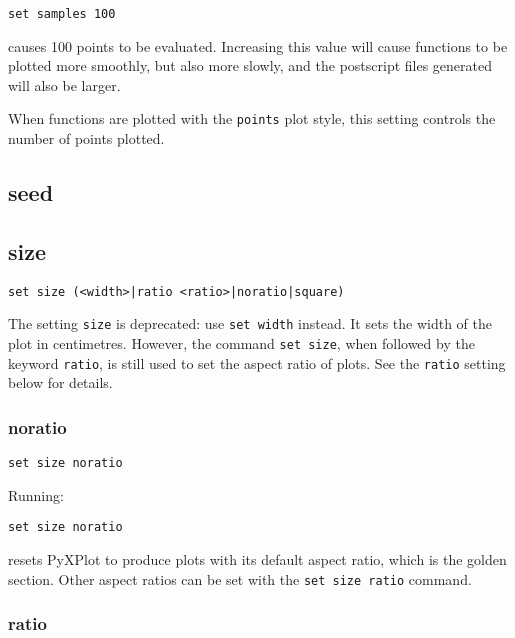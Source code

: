 \begin{verbatim}
set samples 100
\end{verbatim}

\noindent causes 100 points to be evaluated.  Increasing this value will cause
functions to be plotted more smoothly, but also more slowly, and the postscript
files generated will also be larger.

When functions are plotted with the {\tt points} plot style, this setting
controls the number of points plotted.


\subsection{seed}


\subsection{size}

\begin{verbatim}
set size (<width>|ratio <ratio>|noratio|square)
\end{verbatim}

The setting {\tt size} is deprecated: use {\tt set width} instead.  It sets the
width of the plot in centimetres. However, the command {\tt set size}, when
followed by the keyword {\tt ratio}, is still used to set the aspect ratio of
plots. See the {\tt ratio} setting below for details.


\subsubsection{noratio}

\begin{verbatim}
set size noratio
\end{verbatim}

Running:

\begin{verbatim}
set size noratio
\end{verbatim}

\noindent resets PyXPlot to produce plots with its default aspect ratio, which is the
golden section. Other aspect ratios can be set with the {\tt set size ratio}
command.


\subsubsection{ratio}

